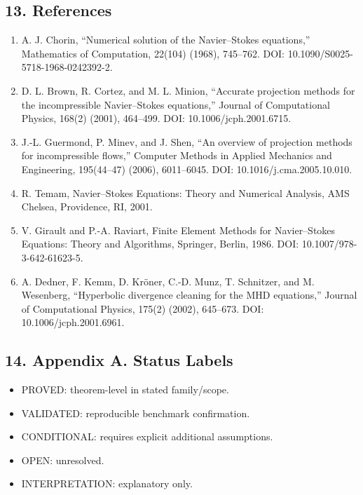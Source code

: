 \documentclass[11pt]{article}
\begin{document}
\subsection*{13. References}
\begin{enumerate}
\item A. J. Chorin, “Numerical solution of the Navier–Stokes equations,” Mathematics of Computation, 22(104) (1968), 745–762. DOI: 10.1090/S0025-5718-1968-0242392-2.
\item D. L. Brown, R. Cortez, and M. L. Minion, “Accurate projection methods for the incompressible Navier–Stokes equations,” Journal of Computational Physics, 168(2) (2001), 464–499. DOI: 10.1006/jcph.2001.6715.
\item J.-L. Guermond, P. Minev, and J. Shen, “An overview of projection methods for incompressible flows,” Computer Methods in Applied Mechanics and Engineering, 195(44–47) (2006), 6011–6045. DOI: 10.1016/j.cma.2005.10.010.
\item R. Temam, Navier–Stokes Equations: Theory and Numerical Analysis, AMS Chelsea, Providence, RI, 2001.
\item V. Girault and P.-A. Raviart, Finite Element Methods for Navier–Stokes Equations: Theory and Algorithms, Springer, Berlin, 1986. DOI: 10.1007/978-3-642-61623-5.
\item A. Dedner, F. Kemm, D. Kröner, C.-D. Munz, T. Schnitzer, and M. Wesenberg, “Hyperbolic divergence cleaning for the MHD equations,” Journal of Computational Physics, 175(2) (2002), 645–673. DOI: 10.1006/jcph.2001.6961.
\end{enumerate}

\subsection*{14. Appendix A. Status Labels}
\begin{itemize}
\item PROVED: theorem-level in stated family/scope.
\item VALIDATED: reproducible benchmark confirmation.
\item CONDITIONAL: requires explicit additional assumptions.
\item OPEN: unresolved.
\item INTERPRETATION: explanatory only.
\end{itemize}
\end{document}
